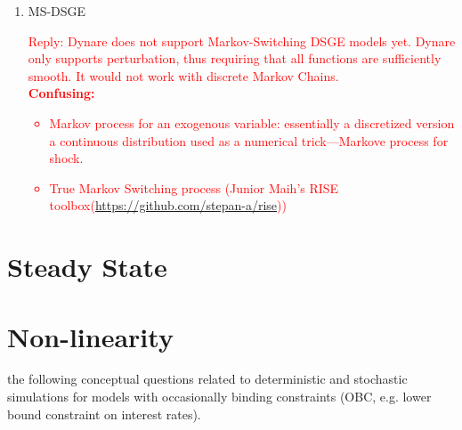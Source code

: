 \documentclass[cn,10pt,math=newtx,citestyle=gb7714-2015,bibstyle=gb7714-2015]{elegantbook}
\begin{document}
{{\begin{enumerate}
		\textcolor{red}{Reply:
			\begin{itemize}
				\item It is generalized eigenvalues. This is not a problem, unless you get oscillating IRFs.
				\item No, this is not appropriate. There is one unique correct timing and you cannot arbitarily shift timing.
			\end{itemize}
		}
		\item MS-DSGE\\
		\textcolor{red}{Reply: Dynare does not support Markov-Switching DSGE models yet. Dynare only supports perturbation, thus requiring that all functions are sufficiently smooth. It would not work with discrete Markov Chains.\\
			\textbf{Confusing:}
			\begin{itemize}
				\item Markov process for an exogenous variable: essentially a discretized version a continuous distribution used as a numerical trick---Markove process for shock.
				\item True Markov Switching process (Junior Maih's RISE toolbox(\url{https://github.com/stepan-a/rise}))
			\end{itemize}
		}
		
		
	\end{enumerate}
	
	\section{Steady State}
	
	\section{Non-linearity}
	the following conceptual questions related to deterministic and stochastic simulations for models with occasionally binding constraints (OBC, e.g. lower bound constraint on interest rates).
	
}}
\end{document}
